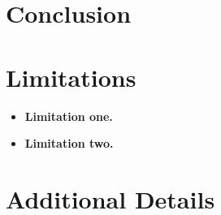 \documentclass[11pt,letterpaper]{soar_preprint}
\begin{document}
\section{Conclusion}
\lipsum[11][1-3]

\section*{Limitations}
\begin{itemize}[leftmargin=*]
\item \textbf{Limitation one.} \lipsum[12][1-2]
\item \textbf{Limitation two.} \lipsum[13][1-2]
\end{itemize}



\clearpage
\appendix
\section{Additional Details}
\label{sec:appendix}
\lipsum[14][1-4]
\end{document}
